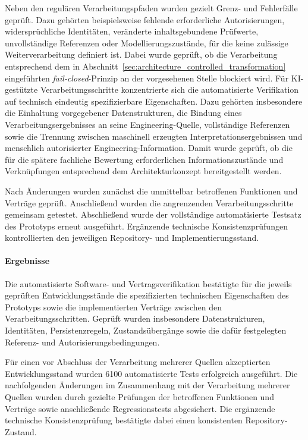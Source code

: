 Neben den regulären Verarbeitungspfaden wurden gezielt Grenz- und
Fehlerfälle geprüft. Dazu gehörten beispielsweise fehlende erforderliche
Autorisierungen, widersprüchliche Identitäten, veränderte inhaltsgebundene
Prüfwerte, unvollständige Referenzen oder Modellierungszustände, für die
keine zulässige Weiterverarbeitung definiert ist. Dabei wurde geprüft, ob
die Verarbeitung entsprechend dem in
Abschnitt~\ref{sec:architecture_controlled_transformation} eingeführten
\emph{fail-closed}-Prinzip an der vorgesehenen Stelle blockiert wird.
\newpage
Für KI-gestützte Verarbeitungsschritte konzentrierte sich die
automatisierte Verifikation auf technisch eindeutig spezifizierbare
Eigenschaften. Dazu gehörten insbesondere die Einhaltung vorgegebener
Datenstrukturen, die Bindung eines Verarbeitungsergebnisses an seine
Engineering-Quelle, vollständige Referenzen sowie die Trennung zwischen
maschinell erzeugten Interpretationsergebnissen und menschlich
autorisierter Engineering-Information. Damit wurde geprüft, ob die für die
spätere fachliche Bewertung erforderlichen Informationszustände und
Verknüpfungen entsprechend dem Architekturkonzept bereitgestellt werden.

Nach Änderungen wurden zunächst die unmittelbar betroffenen Funktionen und
Verträge geprüft. Anschließend wurden die angrenzenden
Verarbeitungsschritte gemeinsam getestet. Abschließend wurde der
vollständige automatisierte Testsatz des Prototyps erneut ausgeführt.
Ergänzende technische Konsistenzprüfungen kontrollierten den jeweiligen
Repository- und Implementierungsstand.

\paragraph{Ergebnisse}

Die automatisierte Software- und Vertragsverifikation bestätigte für die
jeweils geprüften Entwicklungsstände die spezifizierten technischen
Eigenschaften des Prototyps sowie die implementierten Verträge zwischen den
Verarbeitungsschritten. Geprüft wurden insbesondere Datenstrukturen,
Identitäten, Persistenzregeln, Zustandsübergänge sowie die dafür
festgelegten Referenz- und Autorisierungsbedingungen.

Für einen vor Abschluss der Verarbeitung mehrerer Quellen akzeptierten
Entwicklungsstand wurden 6100 automatisierte Tests erfolgreich ausgeführt.
Die nachfolgenden Änderungen im Zusammenhang mit der Verarbeitung mehrerer
Quellen wurden durch gezielte Prüfungen der betroffenen Funktionen und
Verträge sowie anschließende Regressionstests abgesichert. Die ergänzende
technische Konsistenzprüfung bestätigte dabei einen konsistenten
Repository-Zustand.


